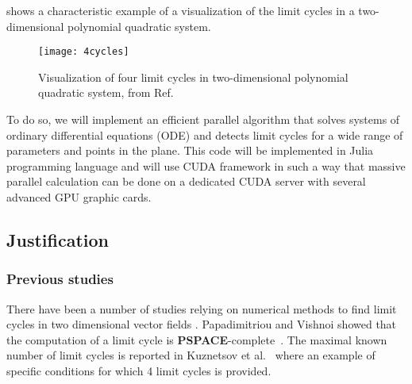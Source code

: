  shows a characteristic example of a visualization of the limit cycles in a two-dimensional polynomial quadratic system.

\begin{figure}[H]
    \centering
    \texttt{[image: 4cycles]}
    \caption{Visualization of four limit cycles in two-dimensional polynomial quadratic system, from Ref.~\cite{kuznetsov_visualization_2013}
    }%
    \label{fig:kuznetsov}
\end{figure}

To do so, we will implement an efficient parallel algorithm that solves systems of ordinary differential equations (ODE) and
detects limit cycles for a wide range of parameters and points in the plane.
This code will be implemented in Julia programming language and will use CUDA framework
in such a way that massive parallel calculation can be done on a dedicated CUDA server with several advanced GPU graphic cards.


\subsection{Justification}
\subsubsection{Previous studies}

There have been a number of studies relying on numerical methods to find limit cycles in
two dimensional vector fields
\cite{leonov_hidden_2013,van_der_hoff_numerical_2013,casades_computation_2013,gasull_effective_nodate}.
Papadimitriou and Vishnoi showed that the computation of a limit cycle is
\textbf{PSPACE}-complete~\cite{papadimitriou_computational_2015}.
The maximal known number of limit cycles is reported in Kuznetsov et al.~\cite{kuznetsov_visualization_2013} where an example of specific conditions for which 4 limit cycles is provided.


